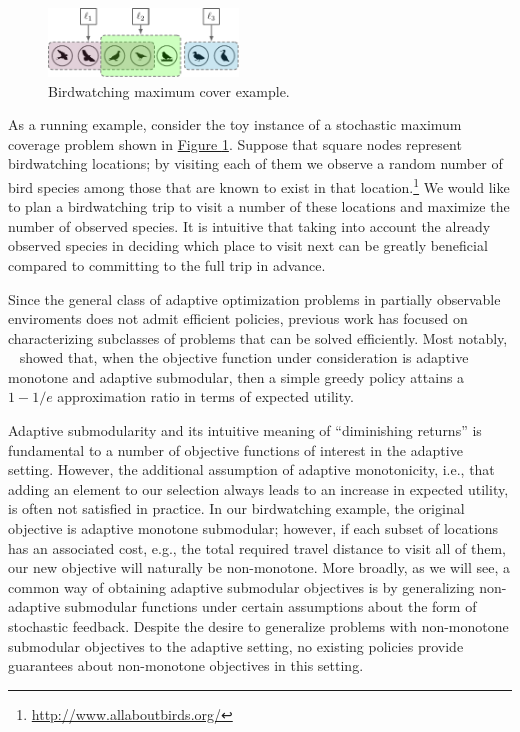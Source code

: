 \documentclass{article}
\newcommand{\figref}[1]{\hyperref[#1]{Figure \ref*{#1}}}
\newcommand{\citet}[1]{\citeauthor{#1}~\shortcite{#1}}
\begin{document}
\begin{figure}[tb]
  \centering
  \includegraphics[width=0.45\textwidth]{figures/birdwatching.pdf}
  \caption{Birdwatching maximum cover example.}\label{fig:toy}
\end{figure}

As a running example, consider the toy instance of a stochastic maximum coverage problem shown in \figref{fig:toy}.
Suppose that square nodes represent birdwatching locations; by visiting each of them we observe a random number of bird species among those that are known to exist in that location.\footnote{\url{http://www.allaboutbirds.org/}}
We would like to plan a birdwatching trip to visit a number of these locations and maximize the number of observed species.
It is intuitive that taking into account the already observed species in deciding which place to visit next can be greatly beneficial compared to committing to the full trip in advance.

Since the general class of adaptive optimization problems in partially observable enviroments does not admit efficient policies, previous work has focused on characterizing subclasses of problems that can be solved efficiently.
Most notably, \citet{golovin11} showed that, when the objective function under consideration is adaptive monotone and adaptive submodular, then a simple greedy policy attains a $1-1/e$ approximation ratio in terms of expected utility.

Adaptive submodularity and its intuitive meaning of ``diminishing returns'' is fundamental to a number of objective functions of interest in the adaptive setting.
However, the additional assumption of adaptive monotonicity, i.e., that adding an element to our selection always leads to an increase in expected utility, is often not satisfied in practice.
In our birdwatching example, the original objective is adaptive monotone submodular; however, if each subset of locations has an associated cost, e.g., the total required travel distance to visit all of them, our new objective will naturally be non-monotone.
More broadly, as we will see, a common way of obtaining adaptive submodular objectives is by generalizing non-adaptive submodular functions under certain assumptions about the form of stochastic feedback.
Despite the desire to generalize problems with non-monotone submodular objectives to the adaptive setting, no existing policies provide guarantees about non-monotone objectives in this setting.
\end{document}
